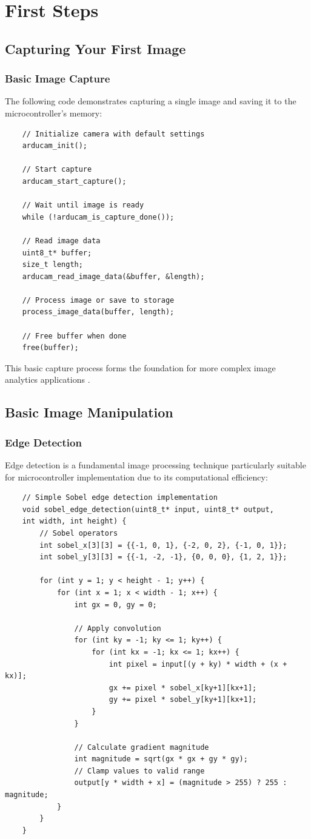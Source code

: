 \section{First Steps}
\subsection{Capturing Your First Image}
\subsubsection{Basic Image Capture}
The following code demonstrates capturing a single image and saving it to the microcontroller's memory:

\begin{verbatim}
	// Initialize camera with default settings
	arducam_init();
	
	// Start capture
	arducam_start_capture();
	
	// Wait until image is ready
	while (!arducam_is_capture_done());
	
	// Read image data
	uint8_t* buffer;
	size_t length;
	arducam_read_image_data(&buffer, &length);
	
	// Process image or save to storage
	process_image_data(buffer, length);
	
	// Free buffer when done
	free(buffer);
\end{verbatim}

This basic capture process forms the foundation for more complex image analytics applications \cite{Hagemann:2021}.

\subsection{Basic Image Manipulation}
\subsubsection{Edge Detection}
Edge detection is a fundamental image processing technique particularly suitable for microcontroller implementation due to its computational efficiency:

\begin{verbatim}
	// Simple Sobel edge detection implementation
	void sobel_edge_detection(uint8_t* input, uint8_t* output, 
	int width, int height) {
		// Sobel operators
		int sobel_x[3][3] = {{-1, 0, 1}, {-2, 0, 2}, {-1, 0, 1}};
		int sobel_y[3][3] = {{-1, -2, -1}, {0, 0, 0}, {1, 2, 1}};
		
		for (int y = 1; y < height - 1; y++) {
			for (int x = 1; x < width - 1; x++) {
				int gx = 0, gy = 0;
				
				// Apply convolution
				for (int ky = -1; ky <= 1; ky++) {
					for (int kx = -1; kx <= 1; kx++) {
						int pixel = input[(y + ky) * width + (x + kx)];
						gx += pixel * sobel_x[ky+1][kx+1];
						gy += pixel * sobel_y[ky+1][kx+1];
					}
				}
				
				// Calculate gradient magnitude
				int magnitude = sqrt(gx * gx + gy * gy);
				// Clamp values to valid range
				output[y * width + x] = (magnitude > 255) ? 255 : magnitude;
			}
		}
	}
\end{verbatim}

